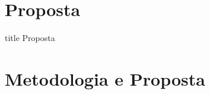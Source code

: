 \documentclass{beamer}
\begin{document}

\section{Proposta}
\begin{frame}
    \centering
    \vfill
    \begin{beamercolorbox}[sep=12pt,center,rounded=true,shadow=true]{title}
        Proposta\par
    \end{beamercolorbox}
    \vfill
\end{frame}

\section{Metodologia e Proposta}
\end{document}
